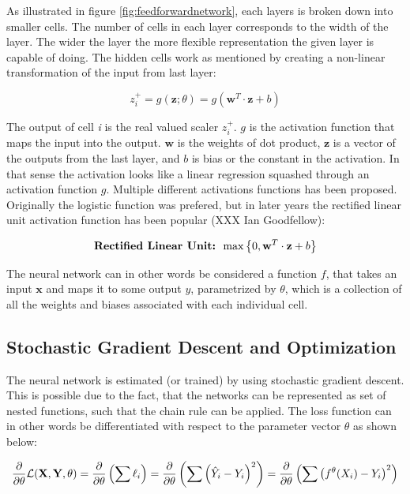 As illustrated in figure \ref{fig:feedforwardnetwork}, each layers is broken down into smaller cells. The number of cells in each layer corresponds to the width of the layer. The wider the layer the more flexible representation the given layer is capable of doing. The hidden cells work as mentioned by creating a non-linear transformation of the input from last layer:

\begin{equation}
    z_i^{+} = g(\textbf{z}; \theta) = g(\textbf{w}^T \cdot \textbf{z} + b)
\end{equation}

The output of cell \textit{i} is the real valued scaler $z_i^+$. $g$ is the activation function that maps the input into the output. $\textbf{w}$ is the weights of dot product, $\textbf{z}$ is a vector of the outputs from the last layer, and $b$ is bias or the constant in the activation. In that sense the activation looks like a linear regression squashed through an activation function $g$. Multiple different activations functions has been proposed. Originally the logistic function was prefered, but in later years the rectified linear unit activation function has been popular (XXX Ian Goodfellow):

\begin{equation}
    \textbf{Rectified Linear Unit: }  \max \left\{ 0, \textbf{w}^T \cdot \textbf{z} + b \right\}
\end{equation}

The neural network can in other words be considered a function $f$, that takes an input $\textbf{x}$ and maps it to some output $y$, parametrized by $\theta$, which is a collection of all the weights and biases associated with each individual cell.

\subsection{Stochastic Gradient Descent and Optimization}

The neural network is estimated (or trained) by using stochastic gradient descent. This is possible due to the fact, that the networks can be represented as set of nested functions, such that the chain rule can be applied. The loss function can in other words be differentiated with respect to the parameter vector $\theta$ as shown below:

\begin{equation}\label{eq:loss_function}
    \frac{\partial}{\partial\theta} \mathcal{L} (\textbf{X}, \textbf{Y}, \theta) = \frac{\partial}{\partial\theta} \left( \sum \ell_i \right) = \frac{\partial}{\partial\theta} \left( \sum \left( \hat{Y}_i  - Y_i \right)^2 \right) = \frac{\partial}{\partial\theta} \left( \sum \left( f^{\theta}(X_i)  - Y_i \right)^2 \right)
\end{equation}

